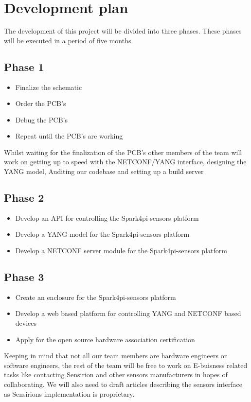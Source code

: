 \documentclass[12pt]{article}
\begin{document}
\section{Development plan}
The development of this project will be divided into three phases. 
These phases will be executed in a period of five months.
\subsection{Phase 1}
\begin{itemize}
    \item Finalize the schematic
    \item Order the PCB's
    \item Debug the PCB's
    \item Repeat until the PCB's are working
\end{itemize}
Whilst waiting for the finalization of the PCB's other members of the team will
work on getting up to speed with the NETCONF/YANG interface, designing the 
YANG model, Auditing our codebase and setting up a build server
\subsection{Phase 2}
\begin{itemize}
    \item Develop an API for controlling the Spark4pi-sensors platform
    \item Develop a YANG model for the Spark4pi-sensors platform
    \item Develop a NETCONF server module for the Spark4pi-sensors platform
\end{itemize}
\subsection{Phase 3}
\begin{itemize}
    \item Create an enclosure for the Spark4pi-sensors platform
    \item Develop a web based platform for controlling YANG and NETCONF based devices
    \item Apply for the open source hardware association certification
\end{itemize}
Keeping in mind that not all our team members are hardware engineers or software engineers, the rest of the team will be 
free to work on E-buisness related tasks like contacting Sensirion and other sensors manufacturers in hopes of collaborating.
We will also need to draft articles describing the sensors interface as Sensirions implementation is proprietary.
\end{document}
